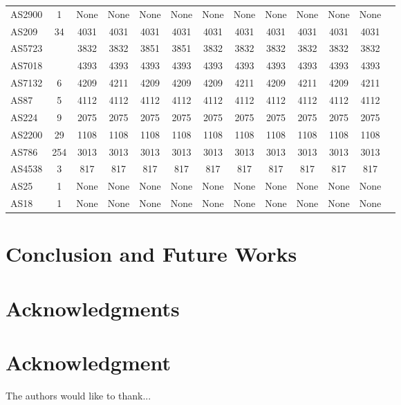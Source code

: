 \documentclass[10pt,journal,compsoc]{IEEEtran}
\begin{document}
\begin{table}[ht]
{\begin{tabular}{lc|cc||cc||cc||cc||cc||c}
AS2900&1  &None & None  &  None&None  & None & None & None & None &None  &None \\
AS209&34 & 4031 &4031  & 4031 & 4031 & 4031 & 4031 & 4031 & 4031 & 4031 &4031 \\
AS5723& &3832  & 3832&  3851 &  3851& 3832 & 3832 & 3832 & 3832 & 3832 &3832 \\
AS7018& & 4393 &4393 & 4393 & 4393 & 4393 & 4393 & 4393 & 4393 &4393  & 4393\\
AS7132&6 &\cellcolor{red!40}4209  &\cellcolor{red!40}4211   & 4209 & 4209 & \cellcolor{red!40}4209  & \cellcolor{red!40}4211 & \cellcolor{red!40}4209 & \cellcolor{red!40}4211 &\cellcolor{green!40}4209  &\cellcolor{green!40}4211 \\
AS87& 5 & 4112&4112 & 4112 & 4112  & 4112 & 4112 & 4112 & 4112 & 4112 &4112 \\
AS224& 9 & 2075&2075   &  2075&  2075& 2075 & 2075 & 2075 & 2075 &2075  & 2075\\
AS2200&29 & 1108& 1108  & 1108 &1108  & 1108 & 1108 & 1108 & 1108 &  1108&1108 \\
AS786& 254 &3013 &3013   & 3013 &3013  & 3013 & 3013 & 3013 & 3013 & 3013 &3013 \\
AS4538& 3  &817&817  &  817&817  & 817 & 817 & 817 & 817 & 817 &817 \\
AS25& 1 &None & None  &None  & None & None & None & None & None & None &None \\
AS18&  1&None & None & None & None & None & None & None & None & None &None \\
\hline
\end{tabular}
}
\label{table:ivi-vs-axact}
\end{table}

\section{Conclusion and Future Works}

\IEEEpeerreviewmaketitle

\ifCLASSOPTIONcompsoc
    
  \section*{Acknowledgments}
\else
  \section*{Acknowledgment}
\fi
The authors would like to thank...
\end{document}
